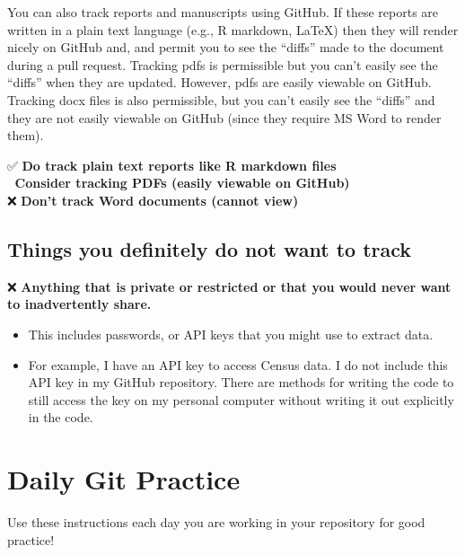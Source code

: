 \documentclass[
]{book}
\providecommand{\tightlist}{%
  \setlength{\itemsep}{0pt}\setlength{\parskip}{0pt}}
\begin{document}
You can also track reports and manuscripts using GitHub. If these reports are
written in a plain text language (e.g., R markdown, LaTeX) then they will render
nicely on GitHub and, and permit you to see the ``diffs'' made to the document
during a pull request. Tracking pdfs is permissible but you can't easily see the
``diffs'' when they are updated. However, pdfs are easily viewable on GitHub.
Tracking docx files is also permissible, but you can't easily see the ``diffs''
and they are not easily viewable on GitHub (since they require MS Word to render
them).

✅ \textbf{Do track plain text reports like R markdown files}\\
🤔 \textbf{Consider tracking PDFs (easily viewable on GitHub)}\\
❌ \textbf{Don't track Word documents (cannot view)}

\section{Things you definitely do not want to track}\label{things-you-definitely-do-not-want-to-track}

❌ \textbf{Anything that is private or restricted or that you would never want to
inadvertently share.}

\begin{itemize}
\tightlist
\item
  This includes passwords, or API keys that you might use to extract data.
\item
  For example, I have an API key to access Census data. I do not include this
  API key in my GitHub repository. There are methods for writing the code to still
  access the key on my personal computer without writing it out explicitly in the
  code.
\end{itemize}

\chapter{Daily Git Practice}\label{daily-git-practice}

Use these instructions each day you are working in your repository for good practice!
\end{document}
